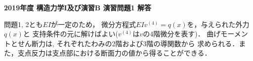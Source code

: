 \documentclass[10pt,a4j]{jarticle}
\newlength{\minitwocolumn}
\begin{document}
\newcommand{\fat}[1]{\mbox{\boldmath $#1$}}
\newcommand{\D}{\partial}
\newcommand{\w}{\omega}
\newcommand{\ga}{\alpha}
\newcommand{\gb}{\beta}
\newcommand{\gx}{\xi}
\newcommand{\gz}{\zeta}
\newcommand{\vhat}[1]{\hat{\fat{#1}}}
\newcommand{\spc}{\vspace{0.7\baselineskip}}
\newcommand{\halfspc}{\vspace{0.3\baselineskip}}

\pagestyle{empty}
\newcommand{\twofig}[2]
 {
   \begin{figure}[h]
     \begin{minipage}[t]{\minitwocolumn}
         \begin{center}   #1
         \end{center}
     \end{minipage}
         \hspace{\columnsep}
     \begin{minipage}[t]{\minitwocolumn}
         \begin{center} #2
         \end{center}
     \end{minipage}
   \end{figure}
 }
\begin{center}
{\Large \bf 2019年度 構造力学I及び演習B 演習問題1 解答} \\
\end{center}
問題1, 2とも$EI$が一定のため，
微分方程式$EIv^{(4)}=q(x)$を，与えられた外力$q(x)$と
支持条件の元に解けばよい($v^{(4)}$は$v$の4階微分を表す)．
曲げモーメントとせん断力は, それぞれたわみの2階および3階の導関数から
求められる．また，支点反力は支点部における断面力の値から得ることができる．
\end{document}
